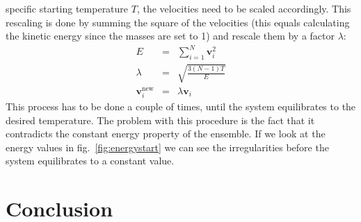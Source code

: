 \documentclass[12pt]{article}
\begin{document}
specific starting temperature $T$, the velocities need to be scaled accordingly. This rescaling is done by summing the square of the velocities
(this equals calculating the kinetic energy since the masses are set to 1) and rescale them by a factor $\lambda$:
\begin{eqnarray}
    E &=& \sum_{i=1}^N \mathbf{v}_i^2\\
    \lambda &=& \sqrt{\frac{3(N-1)T}{E}}\\
    \mathbf{v}_i^\text{new} &=& \lambda \mathbf{v}_i 
\end{eqnarray}
This process has to be done a couple of times, until the system equilibrates to the desired temperature. The problem with this procedure is the fact
that it contradicts the constant energy property of the ensemble. If we look at the energy values in fig.~\ref{fig:energystart} we can see the
irregularities before the system equilibrates to a constant value.





\newpage
\section{Conclusion}






\newpage


\end{document}
